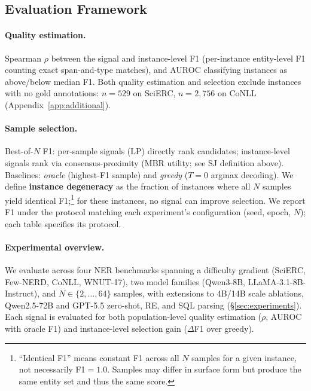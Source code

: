 \subsection{Evaluation Framework}\label{sec:evaluation}

\paragraph{Quality estimation.}
Spearman $\rho$ between the signal and instance-level F1 (per-instance entity-level F1 counting exact span-and-type matches), and AUROC classifying instances as above/below median F1.
Both quality estimation and selection exclude instances with no gold annotations: $n{=}529$ on SciERC, $n{=}2{,}756$ on CoNLL (Appendix~\ref{app:additional}).

\paragraph{Sample selection.}
Best-of-$N$ F1: per-sample signals (LP) directly rank candidates; instance-level signals rank via consensus-proximity (MBR utility; see SJ definition above).
Baselines: \textit{oracle} (highest-F1 sample) and \textit{greedy} ($T{=}0$ argmax decoding).
We define \textbf{instance degeneracy} as the fraction of instances where all $N$ samples yield identical F1;\footnote{``Identical F1'' means constant F1 across all $N$ samples for a given instance, not necessarily F1${=}1.0$. Samples may differ in surface form but produce the same entity set and thus the same score.} for these instances, no signal can improve selection.
We report F1 under the protocol matching each experiment's configuration (seed, epoch, $N$); each table specifies its protocol.

\paragraph{Experimental overview.}
We evaluate across four NER benchmarks spanning a difficulty gradient (SciERC, Few-NERD, CoNLL, WNUT-17), two model families (Qwen3-8B, LLaMA-3.1-8B-Instruct), and $N \in \{2, \ldots, 64\}$ samples, with extensions to 4B/14B scale ablations, Qwen2.5-72B and GPT-5.5 zero-shot, RE, and SQL parsing (\S\ref{sec:experiments}).
Each signal is evaluated for both population-level quality estimation ($\rho$, AUROC with oracle F1) and instance-level selection gain ($\Delta$F1 over greedy).


